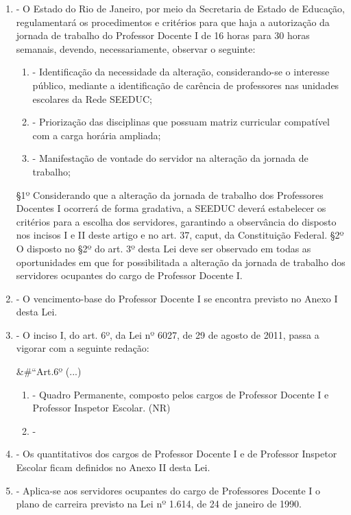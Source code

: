 \documentclass[10pt]{article}
\begin{document}
\begin{enumerate}[label=Art. \arabic*\textdegree]
\item - O Estado do Rio de Janeiro, por meio da Secretaria de Estado de Educação, regulamentará os procedimentos e critérios para que haja a autorização da jornada de trabalho do Professor Docente I de 16 horas para 30 horas semanais, devendo, necessariamente, observar o seguinte:
\begin{enumerate}[label=\Roman*]
\item - Identificação da necessidade da alteração, considerando-se o interesse público, mediante a identificação de carência de professores nas unidades escolares da Rede SEEDUC;
\item - Priorização das disciplinas que possuam matriz curricular compatível com a carga horária ampliada;
\item - Manifestação de vontade do servidor na alteração da jornada de trabalho;
\end{enumerate}
§1º Considerando que a alteração da jornada de trabalho dos Professores Docentes I ocorrerá de forma gradativa, a SEEDUC deverá estabelecer os critérios para a escolha dos servidores, garantindo a observância do disposto nos incisos I e II deste artigo e no art. 37, caput, da Constituição Federal.  
§2º O disposto no §2º do art. 3º desta Lei deve ser observado em todas as oportunidades em que for possibilitada a alteração da jornada de trabalho dos servidores ocupantes do cargo de Professor Docente I.  

\item - O vencimento-base do Professor Docente I se encontra previsto no Anexo I desta Lei.

\item - O inciso I, do art. 6º, da Lei nº 6027, de 29 de agosto de 2011, passa a vigorar com a seguinte redação:




&#``Art.6º (...)
\begin{enumerate}[label=\Roman*]
\item - Quadro Permanente, composto pelos cargos de Professor Docente I e Professor Inspetor Escolar. (NR)
\item - 
\end{enumerate}





\item - Os quantitativos dos cargos de Professor Docente I e de Professor Inspetor Escolar ficam definidos no Anexo II desta Lei.

\item - Aplica-se aos servidores ocupantes do cargo de Professores Docente I o plano de carreira previsto na Lei nº 1.614, de 24 de janeiro de 1990.


\end{enumerate}
\end{document}
